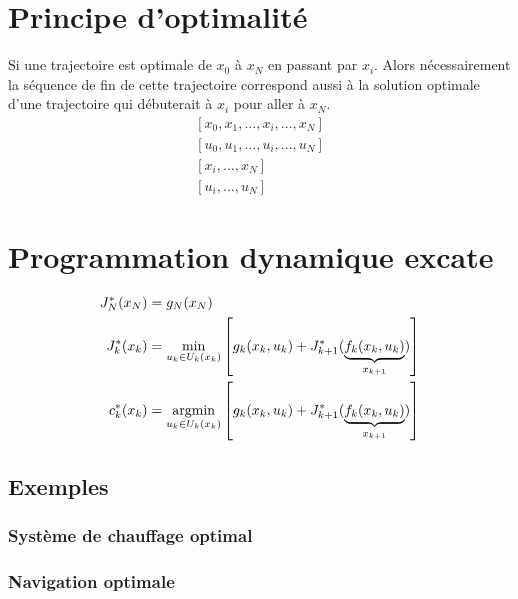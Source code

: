 \section{Principe d'optimalité}

Si une trajectoire est optimale de $x_0$ à $x_N$ en passant par $x_i$. Alors nécessairement la séquence de fin de cette trajectoire correspond aussi à la solution optimale d'une trajectoire qui débuterait à $x_i$ pour aller à $x_N$.
\begin{align}
\left[ x_0 , x_1 , ... , x_i , ... , x_N \right] \\
\left[ u_0 , u_1 , ... , u_i , ... , u_N \right] \\
\left[  x_i , ... , x_N \right] \\
\left[  u_i , ... , u_N \right]
\end{align}


\section{Programmation dynamique excate}




\begin{align}
J^*_N(x_N) &= g_N(x_N) \\
J^*_k(x_k) &= 
\operatornamewithlimits{min}\limits_{u_k \in U_k(x_k)}
\left[
g_k(x_k , u_k ) + J^*_{k+1}( 
\underbrace{
f_k(x_k , u_k ) 
}_{x_{k+1}}
)
\right] \\
c^*_k(x_k) &= 
\operatornamewithlimits{argmin}\limits_{u_k\in U_k(x_k)}
\left[
g_k(x_k , u_k ) + J^*_{k+1}( 
\underbrace{
f_k(x_k , u_k ) 
}_{x_{k+1}}
)
\right] 
\label{eq:exactdp}
\end{align} 

\subsection{Exemples}

\subsubsection{Système de chauffage optimal}

\subsubsection{Navigation optimale}


